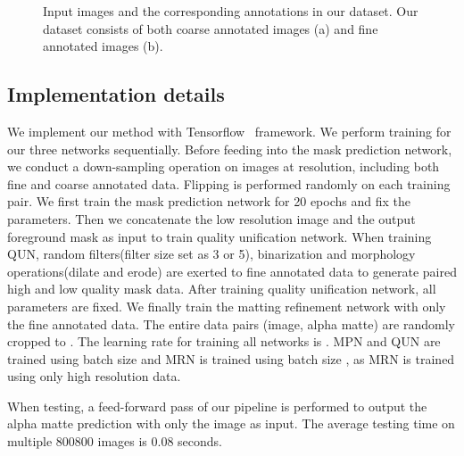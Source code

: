 \documentclass[10pt,twocolumn,letterpaper]{article}
\begin{document}
\begin{figure}[t]
  \centering
  \caption{Input images and the corresponding annotations in our dataset. Our dataset consists of both coarse annotated images (a) and fine annotated images (b).}
  \label{fig: dataset}
\end{figure}

\subsection{Implementation details}

We implement our method with Tensorflow~\cite{abadi2016tensorflow} framework. We perform training for our three networks sequentially. Before feeding into the mask prediction network, we conduct a down-sampling operation on images at  resolution, including both fine and coarse annotated data. Flipping is performed randomly on each training pair. We first train the mask prediction network for 20 epochs and fix the parameters. Then we concatenate the low resolution image and the output foreground mask as input to train quality unification network. When training QUN, random filters(filter size set as 3 or 5), binarization and morphology operations(dilate and erode) are exerted to fine annotated data to generate paired high and low quality mask data. After training quality unification network, all parameters are fixed. We finally train the matting refinement network with only the fine annotated data. The entire data pairs (image, alpha matte) are randomly cropped to . The learning rate for training all networks is . MPN and QUN are trained using batch size  and MRN is trained using batch size , as MRN is trained using only high resolution data.

When testing, a feed-forward pass of our pipeline is performed to output the alpha matte prediction with only the image as input. The average testing time on multiple 800800 images is 0.08 seconds.

\begin{table}[t]
  \centering\scriptsize
    \caption{The configurations of human matting datasets.}
  \label{tab:dataset}
\end{table}
\end{document}

